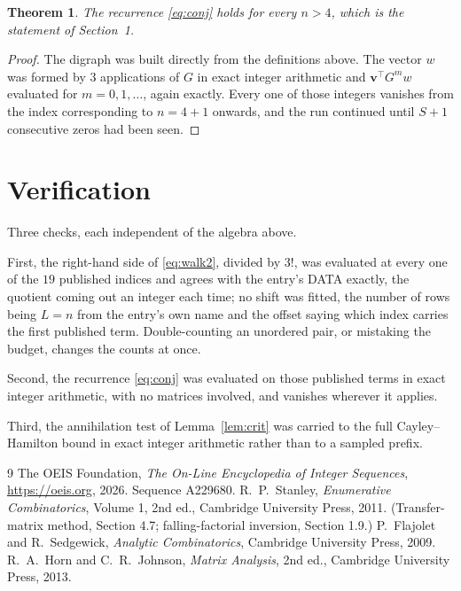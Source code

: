 \documentclass[11pt,a4paper]{article}
\theoremstyle{plain}
\newtheorem{theorem}{Theorem}
\theoremstyle{definition}
\begin{document}
\begin{theorem}
The recurrence \eqref{eq:conj} holds for every $n>4$, which is the statement of
Section~1.
\end{theorem}

\begin{proof}
The digraph was built directly from the definitions above. The vector $w$ was formed by
$3$ applications of $G$ in exact integer arithmetic and $\mathbf{v}^{\!\top}G^{m}w$
evaluated for $m=0,1,\dots$, again exactly. Every one of those integers vanishes from the
index corresponding to $n=4+1$ onwards, and the run continued until $S+1$ consecutive
zeros had been seen.
\end{proof}

\section{Verification}

Three checks, each independent of the algebra above.

First, the right-hand side of \eqref{eq:walk2}, divided by $3!$, was evaluated at every
one of the $19$ published indices and agrees with the entry's DATA exactly, the quotient
coming out an integer each time; no shift was fitted, the number of rows being $L=n$
from the entry's own name and the offset saying which index carries the first published term.
Double-counting an unordered pair, or mistaking the budget, changes the counts at once.

Second, the recurrence \eqref{eq:conj} was evaluated on those published terms in exact
integer arithmetic, with no matrices involved, and vanishes wherever it applies.

Third, the annihilation test of Lemma~\ref{lem:crit} was carried to the full
Cayley--Hamilton bound in exact integer arithmetic rather than to a sampled prefix.

\begin{thebibliography}{9}
 The OEIS Foundation, \emph{The On-Line Encyclopedia of Integer
Sequences}, \url{https://oeis.org}, 2026. Sequence A229680.
 R.~P.~Stanley, \emph{Enumerative Combinatorics}, Volume 1, 2nd ed.,
Cambridge University Press, 2011. (Transfer-matrix method, Section 4.7; falling-factorial
inversion, Section 1.9.)
 P.~Flajolet and R.~Sedgewick, \emph{Analytic Combinatorics}, Cambridge
University Press, 2009.
 R.~A.~Horn and C.~R.~Johnson, \emph{Matrix Analysis}, 2nd ed., Cambridge
University Press, 2013.
\end{thebibliography}
\end{document}
